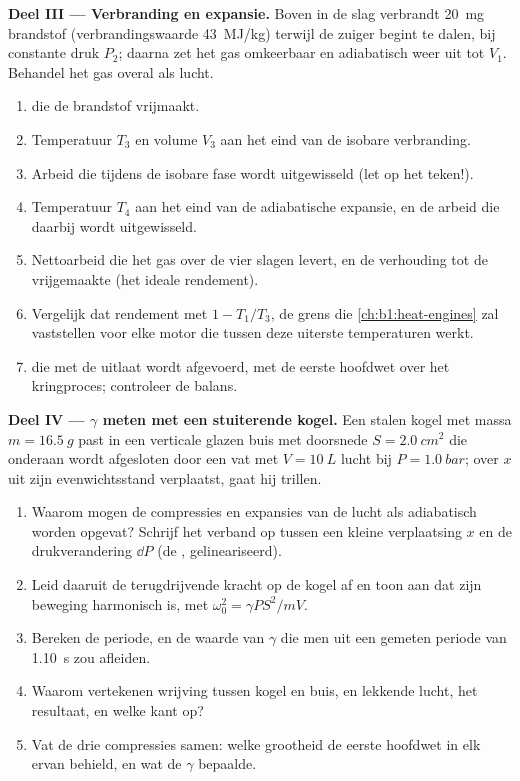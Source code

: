 \begin{problem}
\medskip
\noindent\textbf{Deel III --- Verbranding en expansie.}
Boven in de slag verbrandt \qty{20}{mg} brandstof (verbrandingswaarde
\qty{43}{MJ/kg}) terwijl de zuiger begint te dalen, bij constante druk
$P_2$; daarna zet het gas omkeerbaar en adiabatisch weer uit tot $V_1$.
Behandel het gas overal als lucht.
\begin{enumerate}[resume]
  \item {} die de brandstof vrijmaakt.
  \item Temperatuur $T_3$ en volume $V_3$ aan het eind van de isobare
        verbranding.
  \item Arbeid die tijdens de isobare fase wordt uitgewisseld (let op het teken!).
  \item Temperatuur $T_4$ aan het eind van de adiabatische expansie, en de
        arbeid die daarbij wordt uitgewisseld.
  \item Nettoarbeid die het gas over de vier slagen levert, en de
        verhouding tot de vrijgemaakte  (het ideale rendement).
  \item Vergelijk dat rendement met $1 - T_1/T_3$, de grens die
        \cref{ch:b1:heat-engines} zal vaststellen voor elke motor die tussen
        deze uiterste temperaturen werkt.
  \item {} die met de uitlaat wordt afgevoerd, met de eerste hoofdwet over het
        kringproces; controleer de balans.
\end{enumerate}

\medskip
\noindent\textbf{Deel IV --- $\gamma$ meten met een stuiterende kogel.}
Een stalen kogel met massa $m = \qty{16.5}{g}$ past in een verticale glazen buis met
doorsnede $S = \qty{2.0}{cm^2}$ die onderaan wordt afgesloten door een vat met
$V = \qty{10}{L}$ lucht bij $P = \qty{1.0}{bar}$; over $x$ uit
zijn evenwichtsstand verplaatst, gaat hij trillen.
\begin{enumerate}[resume]
  \item Waarom mogen de compressies en expansies van de lucht als
        adiabatisch worden opgevat? Schrijf het verband op tussen een kleine verplaatsing $x$
        en de drukverandering $\dd P$ (de , gelineariseerd).
  \item Leid daaruit de terugdrijvende kracht op de kogel af en toon aan dat zijn beweging
        harmonisch is, met $\omega_0^2 = \gamma PS^2/mV$.
  \item Bereken de periode, en de waarde van $\gamma$ die men uit een
        gemeten periode van \qty{1.10}{s} zou afleiden.
  \item Waarom vertekenen wrijving tussen kogel en buis, en lekkende lucht,
        het resultaat, en welke kant op?
  \item Vat de drie compressies samen: welke grootheid de eerste hoofdwet
        in elk ervan behield, en wat de  $\gamma$
        bepaalde.
\end{enumerate}
\end{problem}
